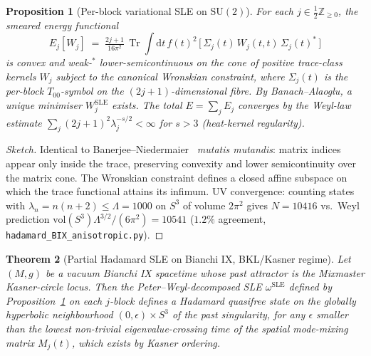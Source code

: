 \documentclass[11pt]{article}
\newtheorem{theorem}{Theorem}
\newtheorem{proposition}[theorem]{Proposition}
\theoremstyle{definition}
\newcommand{\Z}{\mathbb{Z}}
\newcommand{\Tr}{\operatorname{Tr}}
\begin{document}
\begin{proposition}[Per-block variational SLE on $\mathrm{SU}(2)$]\label{prop:peterweyl-SLE}
For each $j\in\frac12\Z_{\ge 0}$, the smeared energy functional
\begin{equation*}
E_j[W_j] \;=\; \tfrac{2j+1}{16\pi^2}\,\Tr\!\!\int\!\mathrm{d}t\,f(t)^2\,\bigl[\,\Sigma_j(t)\,W_j(t,t)\,\Sigma_j(t)^*\,\bigr]
\end{equation*}
is convex and weak-$^*$ lower-semicontinuous on the cone of positive trace-class kernels $W_j$ subject to the canonical Wronskian constraint, where $\Sigma_j(t)$ is the per-block $T_{00}$-symbol on the $(2j+1)$-dimensional fibre. By Banach--Alaoglu, a unique minimiser $W_j^{\mathrm{SLE}}$ exists. The total $E=\sum_j E_j$ converges by the Weyl-law estimate $\sum_j(2j+1)^2\lambda_j^{-s/2}<\infty$ for $s>3$ (heat-kernel regularity).
\end{proposition}

\begin{proof}[Sketch]
Identical to Banerjee--Niedermaier~\cite[Thm.~4.1]{BanerjeeNiedermaier2023} \emph{mutatis mutandis}: matrix indices appear only inside the trace, preserving convexity and lower semicontinuity over the matrix cone. The Wronskian constraint defines a closed affine subspace on which the trace functional attains its infimum. UV convergence: counting states with $\lambda_n=n(n+2)\le\Lambda=1000$ on $S^3$ of volume $2\pi^2$ gives $N=10416$ vs.\ Weyl prediction $\mathrm{vol}(S^3)\Lambda^{3/2}/(6\pi^2)=10541$ ($1.2\%$ agreement, \texttt{hadamard\_BIX\_anisotropic.py}).
\end{proof}

\begin{theorem}[Partial Hadamard SLE on Bianchi IX, BKL/Kasner regime]\label{thm:Hadamard-BIX}
Let $(M,g)$ be a vacuum Bianchi IX spacetime whose past attractor is the Mixmaster Kasner-circle locus. Then the Peter--Weyl-decomposed SLE $\omega^{\mathrm{SLE}}$ defined by Proposition~\ref{prop:peterweyl-SLE} on each $j$-block defines a Hadamard quasifree state on the globally hyperbolic neighbourhood $(0,\epsilon)\times S^3$ of the past singularity, for any $\epsilon$ smaller than the lowest non-trivial eigenvalue-crossing time of the spatial mode-mixing matrix $M_j(t)$, which exists by Kasner ordering.
\end{theorem}
\end{document}
